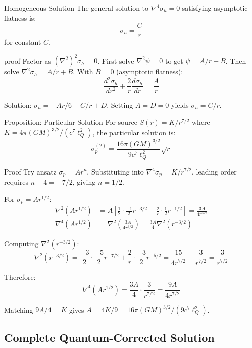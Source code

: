 \documentclass[11pt,a4paper]{article}
\theoremstyle{definition}
\theoremstyle{remark}
\begin{document}
	Homogeneous Solution
		The general solution to $\nabla^4\sigma_h = 0$ satisfying asymptotic flatness is:
		\begin{equation}
			\sigma_h = \frac{C}{r}
		\end{equation}
		for constant $C$.
	
	proof
		Factor as $(\nabla^2)^2\sigma_h = 0$. First solve $\nabla^2\psi = 0$ to get $\psi = A/r + B$. Then solve $\nabla^2\sigma_h = A/r + B$. With $B = 0$ (asymptotic flatness):
		\begin{equation}
			\frac{d^2\sigma_h}{dr^2} + \frac{2}{r}\frac{d\sigma_h}{dr} = \frac{A}{r}
		\end{equation}
		
		Solution: $\sigma_h = -Ar/6 + C/r + D$. Setting $A = D = 0$ yields $\sigma_h = C/r$.
	
	Proposition: Particular Solution
		For source $S(r) = K/r^{7/2}$ where $K = 4\pi(GM)^{3/2}/(c^7\ell_Q^2)$, the particular solution is:
		\begin{equation}
			\sigma_p^{(2)} = \frac{16\pi(GM)^{3/2}}{9c^7\ell_Q^2}\sqrt{r}
		\end{equation}
	
	Proof
		Try ansatz $\sigma_p = Ar^n$. Substituting into $\nabla^4\sigma_p = K/r^{7/2}$, leading order requires $n - 4 = -7/2$, giving $n = 1/2$.
		
		For $\sigma_p = Ar^{1/2}$:
		\begin{align}
			\nabla^2(Ar^{1/2}) &= A\left[\frac{1}{2} \cdot \frac{-1}{2}r^{-3/2} + \frac{2}{r} \cdot \frac{1}{2}r^{-1/2}\right] = \frac{3A}{4r^{3/2}}\\
			\nabla^4(Ar^{1/2}) &= \nabla^2\left(\frac{3A}{4r^{3/2}}\right) = \frac{3A}{4}\nabla^2(r^{-3/2})
		\end{align}
		
		Computing $\nabla^2(r^{-3/2})$:
		\begin{equation}
			\nabla^2(r^{-3/2}) = \frac{-3}{2} \cdot \frac{-5}{2}r^{-7/2} + \frac{2}{r} \cdot \frac{-3}{2}r^{-5/2} = \frac{15}{4r^{7/2}} - \frac{3}{r^{7/2}} = \frac{3}{r^{7/2}}
		\end{equation}
		
		Therefore:
		\begin{equation}
			\nabla^4(Ar^{1/2}) = \frac{3A}{4} \cdot \frac{3}{r^{7/2}} = \frac{9A}{4r^{7/2}}
		\end{equation}
		
		Matching $9A/4 = K$ gives $A = 4K/9 = 16\pi(GM)^{3/2}/(9c^7\ell_Q^2)$.
	
	\subsection{Complete Quantum-Corrected Solution}
	
\end{document}
